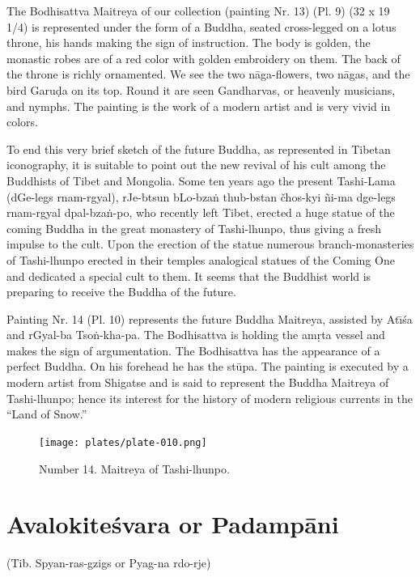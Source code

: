 \documentclass[a4paper, 12pt, oneside]{article}
\begin{document}
\bigskip

The Bodhisattva Maitreya of our collection (painting Nr. 13) (Pl. 9) (32 x 19 1/4) is represented under the form of a Buddha, seated cross-legged on a lotus throne, his hands making the sign of instruction. The body is golden, the monastic robes are of a red color with golden embroidery on them. The back of the throne is richly ornamented. We see the two n\={a}ga-flowers, two n\={a}gas, and the bird Garu\d{d}a on its top. Round it are seen Gandharvas, or heavenly musicians, and nymphs. The painting is the work of a modern artist and is very vivid in colors.

To end this very brief sketch of the future Buddha, as represented in Tibetan iconography, it is suitable to point out the new revival of his cult among the Buddhists of Tibet and Mongolia. Some ten years ago the present Tashi-Lama (dGe-legs rnam-rgyal), rJe-btsun bLo-bza\.{n} thub-bstan čhos-kyi \~{n}i-ma dge-legs rnam-rgyal dpal-bza\.{n}-po, who recently left Tibet, erected a huge statue of the coming Buddha in the great monastery of Tashi-lhunpo, thus giving a fresh impulse to the cult. Upon the erection of the statue numerous branch-monasteries of Tashi-lhunpo erected in their temples analogical statues of the Coming One and dedicated a special cult to them. It seems that the Buddhist world is preparing to receive the Buddha of the future.

\bigskip

Painting Nr. 14 (Pl. 10) represents the future Buddha Maitreya, assisted by At\={\i}\'{s}a and rGyal-ba Tso\.{n}-kha-pa. The Bodhisattva is holding the am\d{r}ta vessel and makes the sign of argumentation. The Bodhisattva has the appearance of a perfect Buddha. On his forehead he has the st\={u}pa. The painting is executed by a modern artist from Shigatse and is said to represent the Buddha Maitreya of Tashi-lhunpo; hence its interest for the history of modern religious currents in the ``Land of Snow.''

\clearpage
\vspace*{\fill}
\begin{figure}[H]
\centering
\texttt{[image: plates/plate-010.png]}
\caption*{Number 14. Maitreya of Tashi-lhunpo.}
\end{figure}
\vspace*{\fill}
\clearpage
\section{Avalokite\'{s}vara or Padamp\={a}ni}
\begin{center}
(Tib. Spyan-ras-gzigs or Pyag-na rdo-rje)
\end{center}
\end{document}
